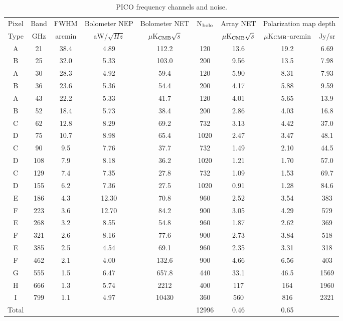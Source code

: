 \documentclass[]{spie}  %
\begin{document}
\begin{table}[ht]
\centering
\caption{PICO frequency channels and noise. }
\label{tab:noise}
\begin{tabular}{|c|c|c|c|c|c|c|cc|}
\hline
Pixel  & Band  & FWHM   & Bolometer NEP & Bolometer NET        & N$_{\rm bolo}$ & Array NET         & \multicolumn{2}{|c|}{Polarization map depth}  \\
Type  & GHz   & arcmin    & aW/$\sqrt{Hz}$ & $\mu$K$_{\rm CMB} \sqrt{s}$ &            & $\mu$K$_{\rm CMB}\sqrt{s}$ & $\mu$K$_{\rm CMB}$-arcmin & Jy/sr     \\ \hline
A        & 21  & 38.4 & 4.89   & 112.2   & 120   & 13.6  & 19.2  & 6.69 \\
B        & 25  & 32.0 & 5.33   & 103.0   & 200   & 9.56   & 13.5 & 7.98  \\
A        & 30  & 28.3 & 4.92   & 59.4    & 120   & 5.90   & 8.31 & 7.93   \\
B        & 36  & 23.6 & 5.36   & 54.4    & 200   & 4.17   & 5.88 & 9.59   \\
A        & 43  & 22.2 & 5.33   & 41.7    & 120   & 4.01   & 5.65 & 13.9   \\
B        & 52  & 18.4 & 5.73   & 38.4    & 200   & 2.86   & 4.03 & 16.8   \\
C        & 62  & 12.8 & 8.29   & 69.2    & 732   & 3.13   & 4.42 & 37.0   \\
D        & 75  & 10.7 & 8.98   & 65.4    & 1020  & 2.47   & 3.47 & 48.1   \\
C        & 90  & 9.5  & 7.76    & 37.7    & 732   & 1.49   & 2.10 & 44.5   \\
D        & 108 & 7.9  & 8.18   & 36.2    & 1020  & 1.21   & 1.70 & 57.0   \\
C        & 129 & 7.4  & 7.35   & 27.8    & 732   & 1.09   & 1.53 & 69.7   \\
D        & 155 & 6.2  & 7.36   & 27.5    & 1020  & 0.91   & 1.28 & 84.6   \\
E        & 186 & 4.3  & 12.30 & 70.8    & 960   & 2.52   & 3.54 & 383    \\
F        & 223 & 3.6  & 12.70 & 84.2    & 900   & 3.05   & 4.29 & 579    \\
E        & 268 & 3.2  & 8.55   & 54.8    & 960   & 1.87   & 2.62 & 369    \\
F        & 321 & 2.6  & 8.16   & 77.6    & 900   & 2.73   & 3.84 & 518    \\
E        & 385 & 2.5  & 4.54   & 69.1    & 960   & 2.35   & 3.31 & 318    \\
F        & 462 & 2.1  & 4.00    & 132.6   & 900   & 4.66   & 6.56 & 403    \\
G        & 555 & 1.5  & 6.47   & 657.8   & 440   & 33.1   & 46.5 & 1569  \\
H        & 666 & 1.3  & 5.74   & 2212    & 400   & 117    & 164  & 1960 \\
I          & 799 & 1.1  & 4.97     & 10430   & 360   & 560    & 816  & 2321 \\ 
\hline
Total   &     &      &       &         & 12996 & 0.46   & 0.65 &   \\
\hline
\end{tabular}
\end{table}
\end{document}
